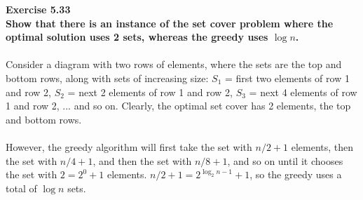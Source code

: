 \documentclass{article}
\newenvironment{problem}[2][Exercise]
    { \begin{mdframed}[backgroundcolor=gray!20] \textbf{#1 #2} \\}
    {  \end{mdframed}}
\begin{document}
\begin{problem}{5.33}
\textbf{Show that there is an instance of the set cover problem where the optimal solution uses 2 sets, whereas the greedy uses $\log n$.}
\\
\\
Consider a diagram with two rows of elements, where the sets are the top and bottom rows, along with sets of increasing size: $S_1$ = first two elements of row 1 and row 2, $S_2$ = next 2 elements of row 1 and row 2, $S_3$ = next 4 elements of row 1 and row 2, ... and so on. Clearly, the optimal set cover has 2 elements, the top and bottom rows. 
\\
\\
However, the greedy algorithm will first take the set with $n / 2 + 1$ elements, then the set with $n / 4 + 1$, and then the set with $n / 8 + 1$, and so on until it chooses the set with $2 = 2^0 + 1$ elements. $n / 2 + 1 = 2^{\log_2 n - 1} + 1$, so the greedy uses a total of $\log n$ sets.
\end{problem}
\end{document}
